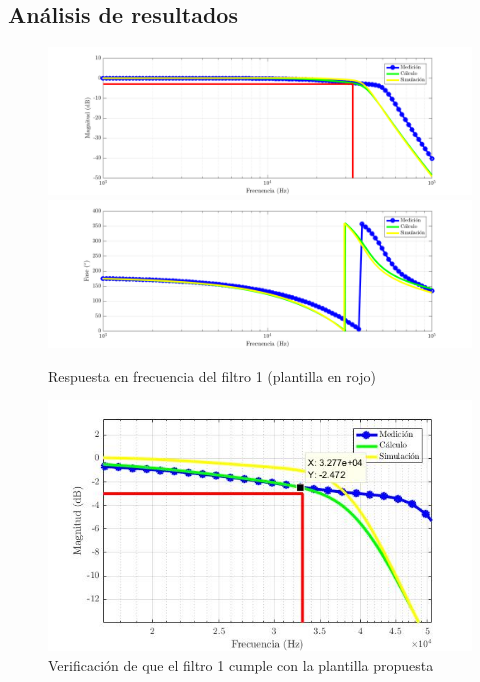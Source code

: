 \documentclass[../../tc_tp5_main.tex]{subfiles}
\begin{document}
\subsection*{An\'alisis de resultados}

\begin{figure}[H]
	\centering
	\includegraphics[scale=0.7]{imagenes/tc_tp5_ej1_leg_mag.png}
	\includegraphics[scale=0.7]{imagenes/tc_tp5_ej1_leg_fase.png}
	\caption{Respuesta en frecuencia del filtro 1 (plantilla en rojo)}
\end{figure}

\begin{figure}[H]
	\centering
	\includegraphics[scale=0.5]{imagenes/leg_bandapasante.jpg}
	\caption{Verificaci\'on de que el filtro 1 cumple con la plantilla propuesta}
\end{figure}
\end{document}

